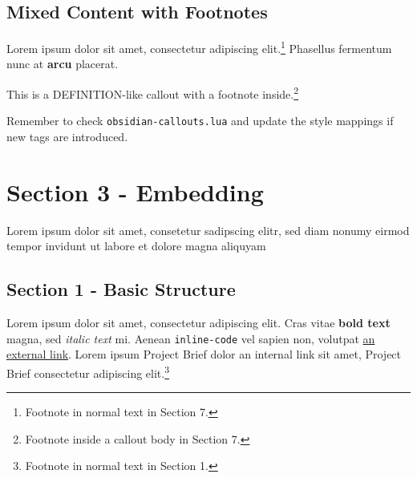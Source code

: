 \subsection{Mixed Content with
Footnotes}\label{mixed-content-with-footnotes}

Lorem ipsum dolor sit amet, consectetur adipiscing elit.\footnote{Footnote
  in normal text in Section 7.} Phasellus fermentum nunc at
\textbf{arcu} placerat.

\begin{tcolorbox}[breakable,colback=ocPinBack,colframe=ocPinFrame,coltitle=ocPinTitle,left=3mm,boxed title style={left=1mm},title={\hspace*{-2.5mm}\iconDefinition\; Definition with footnote}]

This is a DEFINITION-like callout with a footnote inside.\footnote{Footnote
  inside a callout body in Section 7.}

\end{tcolorbox}

\begin{tcolorbox}[breakable,colback=yellow!5!white,colframe=yellow!50!black,left=3mm,boxed title style={left=1mm},title={\hspace*{-2.5mm}\iconTodo\; TODO with inline code}]

Remember to check \texttt{obsidian-callouts.lua} and update the style
mappings if new tags are introduced.

\end{tcolorbox}

\section{Section 3 - Embedding}\label{section-3---embedding}

Lorem ipsum dolor sit amet, consetetur sadipscing elitr, sed diam nonumy
eirmod tempor invidunt ut labore et dolore magna aliquyam

\subsection{Section 1 - Basic
Structure}\label{inner-1-section-1---basic-structure}

Lorem ipsum dolor sit amet, consectetur adipiscing elit. Cras vitae
\textbf{bold text} magna, sed \emph{italic text} mi. Aenean
\texttt{inline-code} vel sapien non, volutpat
\href{https://example.com}{an external link}. Lorem ipsum Project Brief
dolor an internal link sit amet, Project Brief consectetur adipiscing
elit.\footnote{Footnote in normal text in Section 1.}

